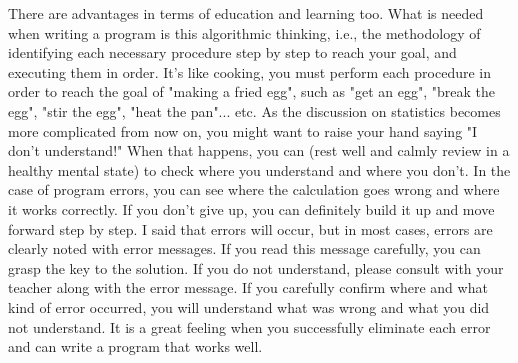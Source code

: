 \documentclass{ltjsbook}
\begin{document}
There are advantages in terms of education and learning too. What is needed when writing a program is this algorithmic thinking, i.e., the methodology of identifying each necessary procedure step by step to reach your goal, and executing them in order. It's like cooking, you must perform each procedure in order to reach the goal of "making a fried egg", such as "get an egg", "break the egg", "stir the egg", "heat the pan"... etc. As the discussion on statistics becomes more complicated from now on, you might want to raise your hand saying "I don't understand!" When that happens, you can (rest well and calmly review in a healthy mental state) to check where you understand and where you don't. In the case of program errors, you can see where the calculation goes wrong and where it works correctly. If you don't give up, you can definitely build it up and move forward step by step. I said that errors will occur, but in most cases, errors are clearly noted with error messages. If you read this message carefully, you can grasp the key to the solution. If you do not understand, please consult with your teacher along with the error message. If you carefully confirm where and what kind of error occurred, you will understand what was wrong and what you did not understand. It is a great feeling when you successfully eliminate each error and can write a program that works well.
\end{document}
